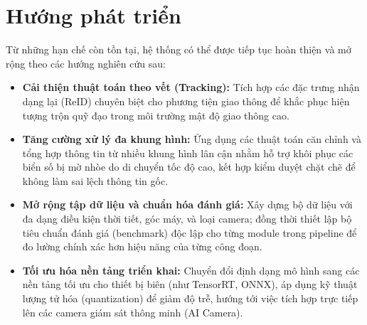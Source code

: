 \documentclass[../DoAn.tex]{subfiles}
\begin{document}
\section{Hướng phát triển}

Từ những hạn chế còn tồn tại, hệ thống có thể được tiếp tục hoàn thiện và mở rộng theo các hướng nghiên cứu sau:
\begin{itemize}
    \item \textbf{Cải thiện thuật toán theo vết (Tracking):} Tích hợp các đặc trưng nhận dạng lại (ReID) chuyên biệt cho phương tiện giao thông để khắc phục hiện tượng trộn quỹ đạo trong môi trường mật độ giao thông cao.
    \item \textbf{Tăng cường xử lý đa khung hình:} Ứng dụng các thuật toán căn chỉnh và tổng hợp thông tin từ nhiều khung hình lân cận nhằm hỗ trợ khôi phục các biển số bị mờ nhòe do di chuyển tốc độ cao, kết hợp kiểm duyệt chặt chẽ để không làm sai lệch thông tin gốc.
    \item \textbf{Mở rộng tập dữ liệu và chuẩn hóa đánh giá:} Xây dựng bộ dữ liệu với đa dạng điều kiện thời tiết, góc máy, và loại camera; đồng thời thiết lập bộ tiêu chuẩn đánh giá (benchmark) độc lập cho từng module trong pipeline để đo lường chính xác hơn hiệu năng của từng công đoạn.
    \item \textbf{Tối ưu hóa nền tảng triển khai:} Chuyển đổi định dạng mô hình sang các nền tảng tối ưu cho thiết bị biên (như TensorRT, ONNX), áp dụng kỹ thuật lượng tử hóa (quantization) để giảm độ trễ, hướng tới việc tích hợp trực tiếp lên các camera giám sát thông minh (AI Camera).
\end{itemize}
\end{document}

